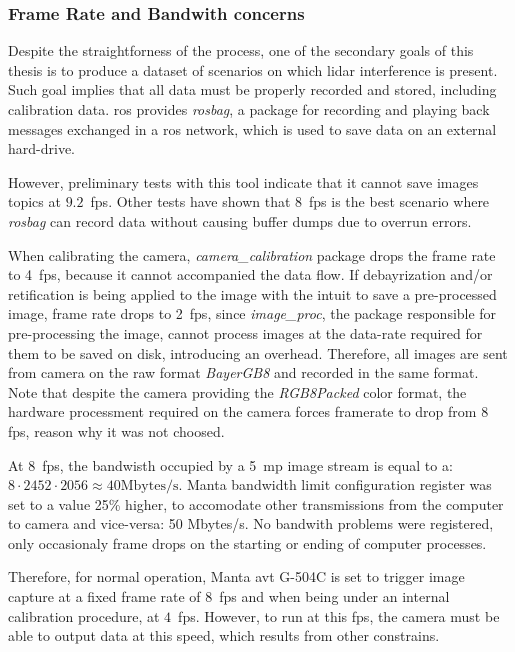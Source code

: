 \subsubsection{Frame Rate and Bandwith concerns}
Despite the straightforness of the process, one of the secondary goals of this thesis is to produce a dataset of scenarios on which \ac{lidar} interference is present. Such goal implies that all data must be properly recorded and stored, including calibration data. \ac{ros} provides \emph{rosbag}, a package for recording and playing back messages exchanged in a \ac{ros} network, which is used to save data on an external hard-drive.

However, preliminary tests with this tool indicate that it cannot save images topics at $9.2$~\ac{fps}. Other tests have shown that $8$~\ac{fps} is the best scenario where \emph{rosbag} can record data without causing buffer dumps due to overrun errors. 


When calibrating the camera, \emph{camera\_calibration} package drops the frame rate to 4~\ac{fps}, because it cannot accompanied the data flow. If debayrization and/or retification is being applied to the image with the intuit to save a pre-processed image, frame rate drops to 2~\ac{fps}, since \emph{image\_proc}, the package responsible for pre-processing the image, cannot process images at the data-rate required for them to be saved on disk, introducing an overhead. Therefore, all images are sent from camera on the raw format \emph{BayerGB8} and recorded in the same format. Note that despite the camera providing  the \emph{RGB8Packed} color format, the hardware processment required on the camera forces framerate to drop from $8$ \ac{fps}, reason why it was not choosed.

At 8~\ac{fps}, the bandwisth occupied by a 5~\ac{mp} image stream is equal to a: $8 \cdot 2452 \cdot 2056 \approx 40 \text{Mbytes/s}$. Manta bandwidth limit configuration register was set to a value 25\% higher, to accomodate other transmissions from the computer to camera and vice-versa: 50 Mbytes/s. No bandwith problems were registered, only occasionaly frame drops on the starting or ending of computer processes.

Therefore, for normal operation, Manta \ac{avt} G-504C is set to trigger image capture at a fixed frame rate of $8$~\ac{fps} and when being under an internal calibration procedure, at $4$~\ac{fps}. However, to run at this \ac{fps}, the camera must be able to output data at this speed, which results from other constrains.

